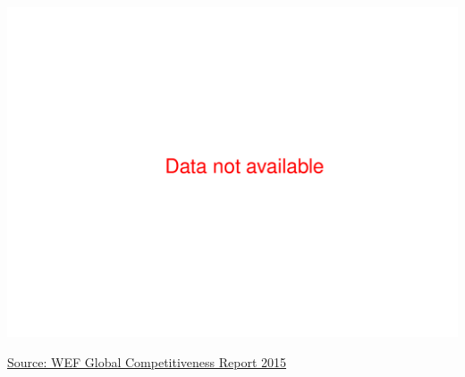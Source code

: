 \documentclass{article}\usepackage[]{graphicx}\usepackage[]{color}
\makeatletter
\def\maxwidth{ %
  \ifdim\Gin@nat@width>\linewidth
    \linewidth
  \else
    \Gin@nat@width
  \fi
}
\makeatother
\begin{document}

\newpage

\begin{minipage}[t]{0.99\textwidth}
  \vspace{0.5cm}
  \begin{minipage}[c]{0.48\textwidth} %
    \vspace*{-0.6cm}


{\centering \includegraphics[width=\maxwidth]{figure/WEFradar-1} 

}



    \vspace*{-0.6cm} 
    \hspace*{0.3cm} \raggedright\footnotesize{\href{http://www.weforum.org/global-competitiveness-report-2015-2016}{Source: WEF Global Competitiveness Report 2015}}
  \end{minipage}
  \begin{minipage}[c]{0.50\textwidth} %
    \vspace*{0.4cm}



\end{minipage}
\end{minipage}
\end{document}
